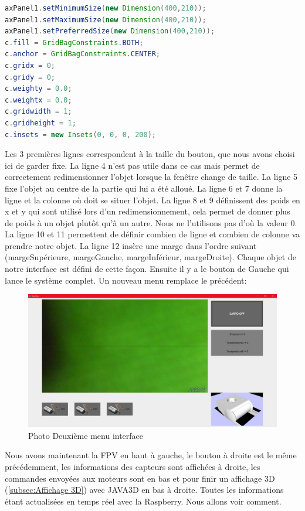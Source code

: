\documentclass[a4paper,11pt]{report}
\begin{document}
				\begin{lstlisting}[language=java]
axPanel1.setMinimumSize(new Dimension(400,210));
axPanel1.setMaximumSize(new Dimension(400,210));
axPanel1.setPreferredSize(new Dimension(400,210));
c.fill = GridBagConstraints.BOTH;
c.anchor = GridBagConstraints.CENTER;
c.gridx = 0;
c.gridy = 0;
c.weighty = 0.0;
c.weightx = 0.0;
c.gridwidth = 1;
c.gridheight = 1;
c.insets = new Insets(0, 0, 0, 200);
				\end{lstlisting}
				Les 3 premières lignes correspondent à la taille du bouton, que nous avons choisi ici de garder fixe.
				\newline La ligne 4 n'est pas utile dans ce cas mais permet de correctement redimensionner l'objet lorsque la fenêtre change de taille.
				\newline La ligne 5 fixe l'objet au centre de la partie qui lui a été alloué.
				\newline La ligne 6 et 7 donne la ligne et la colonne où doit se situer l'objet.
				\newline La ligne 8 et 9 définissent des poids en x et y qui sont utilisé lors d'un redimensionnement, cela permet de donner plus de poids à un objet plutôt qu'à un autre. Nous ne l'utilisons pas d'où la valeur 0.
				\newline La ligne 10 et 11 permettent de définir combien de ligne et combien de colonne va prendre notre objet.
				\newline La ligne 12 insère une marge dans l'ordre suivant (margeSupérieure, margeGauche, margeInférieur, margeDroite).
				\newline Chaque objet de notre interface est défini de cette façon.
				\newline Ensuite il y a le bouton de Gauche qui lance le système complet. Un nouveau menu remplace le précédent:
				\begin{figure}[!h]
					\begin{center}
						\includegraphics[scale=0.15]{Photos/Interface2.png}
						\caption{Photo Deuxième menu interface}
					\end{center}
				\end{figure}
				\newline Nous avons maintenant la FPV en haut à gauche, le bouton à droite est le même précédemment, les informations des capteurs sont affichées à droite, les commandes envoyées aux moteurs sont en bas et pour finir un affichage 3D (\ref{subsec:Affichage 3D}) avec JAVA3D en bas à droite. Toutes les informations étant actualisées en temps réel avec la Raspberry. Nous allons voir comment.
				
\end{document}
